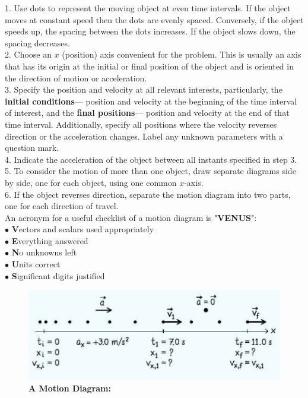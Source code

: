         1. Use dots to represent the moving object at even time intervals. If the object moves at constant speed then the dots are evenly spaced. Conversely, if the object speeds up, the spacing between the dots
        increases. If the object slows down, the spacing decreases. \\
        2. Choose an $x$ (position) axis convenient for the problem. This is usually an axis that has its origin at the initial or final position of the object and is oriented in the direction of motion or acceleration. \\
        3. Specify the position and velocity at all relevant interests, particularly, the \textbf{initial conditions}— position and velocity at the beginning of the time interval of interest, and the
        \textbf{final positions}— position and velocity at the end of that time interval. Additionally, specify all positions where the velocity reverses direction or the acceleration changes. Label any unknown
        parameters with a question mark. \\
        4. Indicate the acceleration of the object between all instants specified in step 3. \\
        5. To consider the motion of more than one object, draw separate diagrams side by side, one for each object, using one common $x$-axis. \\
        6. If the object reverses direction, separate the motion diagram into two parts, one for each direction of travel. \\

        An acronym for a useful checklist of a motion diagram is "\textbf{VENUS}": \\
        $\bullet$ \textbf{V}ectors and scalars used appropriately \\
        $\bullet$ \textbf{E}verything answered \\
        $\bullet$ \textbf{N}o unknowns left \\
        $\bullet$ \textbf{U}nits correct \\
        $\bullet$ \textbf{S}ignificant digits justified \\

        \begin{figure}[hbt!]
            \centering
            \caption*{\textbf{A Motion Diagram:}}
            \includegraphics{Resources/Motion_Diagram}
        \end{figure}




